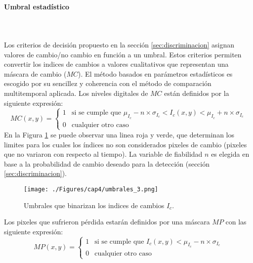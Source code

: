 \paragraph{Umbral estad\'istico} \label{sec:umbralEstadistico2}\mbox{}\\\mbox{}\\
Los criterios de decisi\'on propuesto en la secci\'on \ref{sec:discriminacion} asignan valores de cambio/no cambio en funci\'on a un umbral. Estos criterios permiten convertir los indices de cambios a valores cualitativos que representan una m\'ascara de cambio ($ MC $). El m\'etodo basados en par\'ametros estad\'isticos es escogido por su sencillez y coherencia con el m\'etodo de comparaci\'on multitemporal aplicada. Los niveles digitales de $ MC $ est\'an definidos por la siguiente expresi\'on:
\begin{equation}\label{ec:umbMetodo}
MC(x,y) = \begin{cases}
1 & \text{si se cumple que } \mu_{I_{c}} - n \times \sigma_{I_{c}} < I_{c}(x,y) < \mu_{I_{c}} + n \times \sigma_{I_{c}}\\
0 & \text{cualquier otro caso}  
\end{cases}
\end{equation}
En la Figura \ref{fig:umbrales} se puede observar una linea roja y verde, que determinan los limites para los cuales los \'indices no son considerados pixeles de cambio (pixeles que no variaron con respecto al tiempo). La variable de fiabilidad $ n $ es elegida en base a la probabilidad de cambio deseado para la detecci\'on (secci\'on \ref{sec:discriminacion}).
	\begin{figure}[H]
		\centering
		\texttt{[image: ./Figures/cap4/umbrales\_3.png]}
		\caption{Umbrales que binarizan los indices de cambios $ I_{c} $.}
		\label{fig:umbrales}
	\end{figure}
Los pixeles que sufrieron p\'erdida estar\'an definidos por una m\'ascara $ MP $ con las siguiente expresi\'on:
\begin{equation}\label{ec:umbMetodoMP}
MP(x,y) = \begin{cases}
1 & \text{si se cumple que } I_{c}(x,y) < \mu_{I_{c}} - n \times \sigma_{I_{c}} \\
0 & \text{cualquier otro caso}  
\end{cases}
\end{equation}
